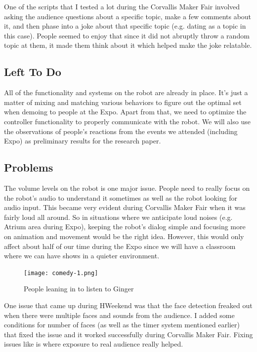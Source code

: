 \documentclass[onecolumn, draftclsnofoot,10pt, compsoc]{IEEEtran}
\begin{document}
One of the scripts that I tested a lot during the Corvallis Maker Fair involved asking the audience questions about a specific topic, make a few comments about it, and then phase into a joke about that specific topic (e.g. dating as a topic in this case). People seemed to enjoy that since it did not abruptly throw a random topic at them, it made them think about it which helped make the joke relatable.

\subsection{Left To Do}
All of the functionality and systems on the robot are already in place. It's just a matter of mixing and matching various behaviors to figure out the optimal set when demoing to people at the Expo. Apart from that, we need to optimize the controller functionality to properly communicate with the robot. We will also use the observations of people's reactions from the events we attended (including Expo) as preliminary results for the research paper. 

\subsection{Problems}
The volume levels on the robot is one major issue. People need to really focus on the robot's audio to understand it sometimes as well as the robot looking for audio input. This became very evident during Corvallis Maker Fair when it was fairly loud all around. So in situations where we anticipate loud noises (e.g. Atrium area during Expo), keeping the robot's dialog simple and focusing more on animation and movement would be the right idea. However, this would only affect about half of our time during the Expo since we will have a classroom where we can have shows in a quieter environment.

\begin{figure}[H]
  \centering
  \texttt{[image: comedy-1.png]}
  \caption{People leaning in to listen to Ginger}
	\label{fig:comedy-1}
\end{figure}

One issue that came up during HWeekend was that the face detection freaked out when there were multiple faces and sounds from the audience. I added some conditions for number of faces (as well as the timer system mentioned earlier) that fixed the issue and it worked successfully during Corvallis Maker Fair. Fixing issues like is where exposure to real audience really helped.
\end{document}
